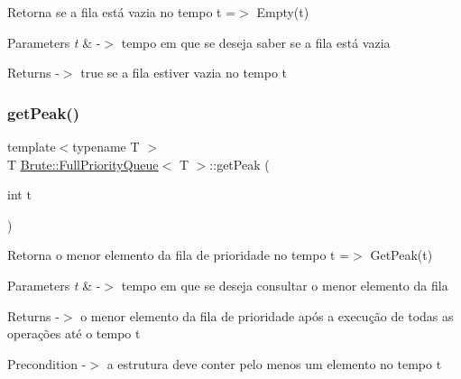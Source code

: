 Retorna se a fila está vazia no tempo t =$>$ Empty(t)


\begin{DoxyParams}{Parameters}
{\em t} & -\/$>$ tempo em que se deseja saber se a fila está vazia \\
\hline
\end{DoxyParams}
\begin{DoxyReturn}{Returns}
-\/$>$ \textquotesingle{}true\textquotesingle{} se a fila estiver vazia no tempo t 
\end{DoxyReturn}
\mbox{\label{classBrute_1_1FullPriorityQueue_a696b62029dba8ba7571a124c64ba94ef}} 
\subsubsection{\texorpdfstring{get\+Peak()}{getPeak()}}
{\footnotesize\ttfamily template$<$typename T $>$ \\
T \hyperlink{classBrute_1_1FullPriorityQueue}{Brute\+::\+Full\+Priority\+Queue}$<$ T $>$\+::get\+Peak (\begin{DoxyParamCaption}\item[{int}]{t }\end{DoxyParamCaption})}

Retorna o menor elemento da fila de prioridade no tempo t =$>$ Get\+Peak(t)


\begin{DoxyParams}{Parameters}
{\em t} & -\/$>$ tempo em que se deseja consultar o menor elemento da fila \\
\hline
\end{DoxyParams}
\begin{DoxyReturn}{Returns}
-\/$>$ o menor elemento da fila de prioridade após a execução de todas as operações até o tempo t 
\end{DoxyReturn}
\begin{DoxyPrecond}{Precondition}
-\/$>$ a estrutura deve conter pelo menos um elemento no tempo t 
\end{DoxyPrecond}
\mbox{\label{classBrute_1_1FullPriorityQueue_a0dbc488046321d9ef58c7b124d9f71a7}} 
